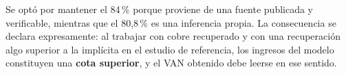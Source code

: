 Se optó por mantener el 84\,\% porque proviene de una fuente publicada y verificable,
mientras que el 80,8\,\% es una inferencia propia. La consecuencia se declara
expresamente: al trabajar con cobre recuperado y con una recuperación algo superior a la
implícita en el estudio de referencia, los ingresos del modelo constituyen una
\textbf{cota superior}, y el VAN obtenido debe leerse en ese sentido.
